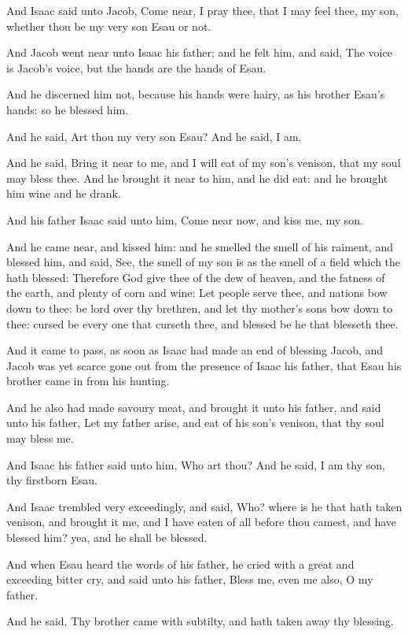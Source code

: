 \Verse And Isaac said unto Jacob, Come near, I pray thee, that I may feel thee, my son, whether thou be my very son Esau or not.

\Verse And Jacob went near unto Isaac his father; and he felt him, and said, The voice is Jacob's voice, but the hands are the hands of Esau.

\Verse And he discerned him not, because his hands were hairy, as his brother Esau's hands: so he blessed him.

\Verse And he said, Art thou my very son Esau? And he said, I am.

\Verse And he said, Bring it near to me, and I will eat of my son's venison, that my soul may bless thee. And he brought it near to him, and he did eat: and he brought him wine and he drank.

\Verse And his father Isaac said unto him, Come near now, and kiss me, my son.

\Verse And he came near, and kissed him: and he smelled the smell of his raiment, and blessed him, and said, See, the smell of my son is as the smell of a field which the \LORD hath blessed: \Verse Therefore God give thee of the dew of heaven, and the fatness of the earth, and plenty of corn and wine: \Verse Let people serve thee, and nations bow down to thee: be lord over thy brethren, and let thy mother's sons bow down to thee: cursed be every one that curseth thee, and blessed be he that blesseth thee.

\Verse And it came to pass, as soon as Isaac had made an end of blessing Jacob, and Jacob was yet scarce gone out from the presence of Isaac his father, that Esau his brother came in from his hunting.

\Verse And he also had made savoury meat, and brought it unto his father, and said unto his father, Let my father arise, and eat of his son's venison, that thy soul may bless me.

\Verse And Isaac his father said unto him, Who art thou? And he said, I am thy son, thy firstborn Esau.

\Verse And Isaac trembled very exceedingly, and said, Who? where is he that hath taken venison, and brought it me, and I have eaten of all before thou camest, and have blessed him? yea, and he shall be blessed.

\Verse And when Esau heard the words of his father, he cried with a great and exceeding bitter cry, and said unto his father, Bless me, even me also, O my father.

\Verse And he said, Thy brother came with subtilty, and hath taken away thy blessing.

